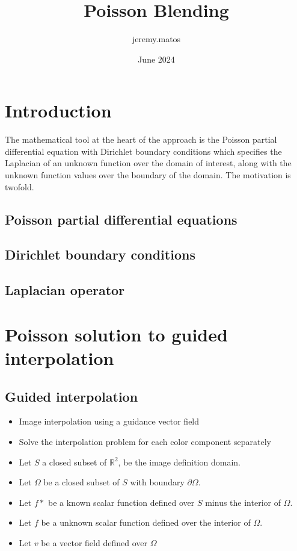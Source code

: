 \documentclass{article}
\title{Poisson Blending}
\author{jeremy.matos}
\date{June 2024}
\begin{document}
\maketitle

\section{Introduction}

The mathematical tool at the heart of the approach is the Poisson partial differential equation with Dirichlet boundary conditions which specifies the Laplacian of an unknown function over the domain of interest, along with the unknown function values over the boundary of the domain. The motivation is twofold.

\subsection*{Poisson partial differential equations}

\subsection*{Dirichlet boundary conditions}

\subsection*{Laplacian operator}

\section{Poisson solution to guided interpolation}

\subsection*{Guided interpolation}

\begin{itemize}
    \item Image interpolation using a guidance vector field
    \item Solve the interpolation problem for each color component separately
\end{itemize}

\begin{itemize}
    \item Let $S$ a closed subset of $\mathbb{R}^2$, be the image definition domain.    %
    \item Let $\Omega$ be a closed subset of $S$ with boundary $\partial \Omega$.   %
    \item Let $f*$ be a known scalar function defined over $S$ minus the interior of $\Omega$.   %
    \item Let $f$ be a unknown scalar function defined over the interior of $\Omega$.   %
    \item Let $v$ be a vector field defined over $\Omega$ 
\end{itemize}
\end{document}
